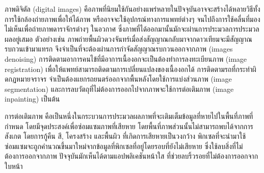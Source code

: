 \documentclass[hidelinks,a4paper,14pt]{article}
\numberwithin{equation}{section}							%
\begin{document}
{%
	
	
	
	
	
	ภาพดิจิตัล (digital images)  คือภาพที่นิยมใช้กันอย่างแพร่หลายในปัจจุบันอาจจะสร้างได้หลายวิธีทั้งการใช้กล้องถ่ายภาพเพื่อให้ได้ภาพ หรืออาจจะใช้อุปกรณ์ทางการแพทย์ต่างๆ จนไปถึงการใช้คลื่นที่มองไม่เห็นเพื่อถ่ายภาพดาราจักรต่างๆ ในอวกาศ  ซึ่งภาพที่ได้ออกมานั้นมักจะผ่านการประมวลการประมวลผลอยู่เสมอ ตัวอย่างเช่น ภาพถ่ายพื้นผิวดวงจันทร์เมื่อส่งสัญญาณกลับมาจากดาวเทียมจะมีสัญญาณรบกวนเข้ามาแทรก จึงจำเป็นที่จะต้องผ่านการกำจัดสัญญาณรบกวนออกจากภาพ (images denoising) การติดตามอาการคนไข้ที่มีอาการเนื้องอกจะเป็นต้องทำการลงทะเบียนภาพ (image registration) เพื่อให้แพทย์สามารถติดตามการเปลี่ยนแปลงของเนื้องอกได้ การติดตามรถที่กระทำผิดกฏหมายจราจร จำเป็นต้องแยกรถยนตร์ออกจากพื้นหลังโดยใช้การแบ่งส่วนภาพ (image segmentation) และการลบวัตถุที่ไม่ต้องการออกไปจากภาพจะใช้การต่อเติมภาพ (image inpainting) เป็นต้น 
	
	
	การต่อเติมภาพ คือเป็นหนึ่งในกระบวนการประมวลผลภาพที่จะเติมเต็มข้อมูลที่หายไปในพื้นที่ภาพที่กำหนด โดยมีจุดประสงค์เพื่อซ่อมแซมภาพที่เสียหาย โดยพื้นที่ภาพส่วนนั้นไม่สามารถพบได้จากการสังเกต โดยการกู้คืน สี, โครงสร้าง และพื้นผิว ที่เกิดการเสียหายเป็นวงกว้าง พิกเซลที่จะนำมาใช้ซ่อมแซมจะถูกคำนวณขึ้นมาใหม่จากข้อมูลที่พิกเซลที่อยู่โดยรอบที่ยังไม่เสียหาย \cite{ref:defination-of-inpaint}  ซึ่งใช้ลบสิ่งที่ไม่ต้องการออกจากภาพ ปัจจุบันมักเห็นได้ตามแอปพลิเคชันหน้าใส ที่ช่วยลบริ้วรอยที่ไม่ต้องการออกจากใบหน้า
	
		
}
\end{document}

